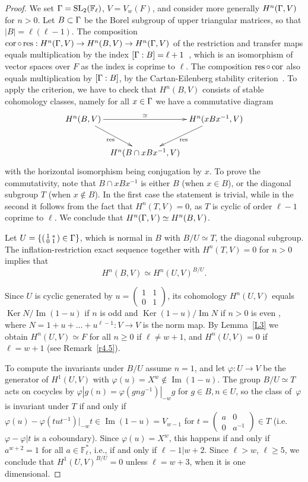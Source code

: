 \documentclass{amsart}
\theoremstyle{plain}
\theoremstyle{definition}
\numberwithin{equation}{section}
\def\im{\operatorname{Im}} \def\ker{\operatorname{Ker}} \def\stab{\operatorname{Stab }}
\def\SL{\mathrm{SL}} \def\PSL{\mathrm{PSL}}\def\GL{\mathrm{GL}}\def\PGL{\mathrm{PGL}}
\def\sm#1#2#3#4{\left(\begin{smallmatrix}#1&#2 \\ #3 & #4 \end{smallmatrix}\right)}
\def\vp{\varphi}
\def\rar{\rightarrow}\def\FF{\mathbb{F}}
\begin{document}
\begin{proof} We set $\G=\SL_2(\FF_\ell)$, $V=V_w(F)$, and 
consider more generally $H^n(\Gamma, V)$ for 
$n>0$. Let $B\subset \Gamma$ be the Borel subgroup of upper triangular matrices,
so that $|B|=\ell(\ell-1)$. The composition $
\cor\circ \res: H^n(\G, V)\rar H^n(B, V) \rar H^n(\G, V)$
of the restriction and transfer maps equals multiplication by the index
$[\Gamma:B]=\ell+1$~\cite[Ch. III, Prop. 9.5]{Br}, which is an isomorphism of  
vector spaces over $F$ as the index is coprime to $\ell$. The composition
$\operatorname{res}\circ \operatorname{cor}$ also equals multiplication by  $[\Gamma:B]$, 
by the Cartan-Eilenberg stability criterion~\cite[Ch. XII Prop. 9.4]{CE}. To
apply the criterion, we have to check that 
$H^n(B, V)$ consists of stable cohomology classes, namely 
for all $x\in \Gamma$ we have a commutative diagram
\[\xymatrix@C0.5em{
     H^n(B,V)\ar[rr]^-{\simeq} \ar[rd]_{\res} & & H^n(xBx^{-1},V)\ar[ld]^{\res} \\
     & H^n(B\cap xBx^{-1},V) &
     }
\]
with the horizontal isomorphism being conjugation by $x$. To prove the commutativity, note 
that $B\cap xBx^{-1}$ is either $B$ (when $x\in B$), or the diagonal subgroup $T$ (when $x\notin B$). 
In the first case the statement is trivial, while in the second it follows 
from the fact that $H^n(T, V)=0$, as $T$ is cyclic of order 
$\ell-1$ coprime to $\ell$. We conclude that $H^n(\Gamma, V)\simeq H^n(B, V)$.

Let $U=\{\sm 1*01 \in \G \}$, which is normal in $B$ with $B/U\simeq T$, 
the diagonal subgroup. The  inflation-restriction exact sequence together with $H^n(T, V)=0$ for 
$n>0$ implies that 
\[ H^n(B, V)\simeq H^n(U, V)^{B/U}.\]

Since $U$ is cyclic generated by $u=\sm 1101$, its cohomology 
$H^n(U, V)$ equals $\ker N/\im(1-u)$ if $n$ is odd and $\ker(1-u)/\im N$
if $n>0$ is even \cite[p. 58]{Br}, where $N=1+u+\ldots+u^{\ell-1}: V\rightarrow V$ 
is the norm map. By Lemma~\ref{L3} we obtain 
$H^n(U, V)\simeq F$ for all $n\ge 0$ if $\ell\ne w+1$, and $H^n(U, V)=0$ if $\ell=w+1$ 
(see Remark~\ref{r4.5}). 

To compute the invariants under $B/U$ assume $n=1$, and let $\vp:U\rar V$ be 
the generator of $H^1(U, V)$ with $\vp(u)=X^w\notin \im(1-u)$.  
The group $B/U\simeq T$ acts on cocycles by 
$\vp|g (n)=\vp(gn g^{-1})|_{-w}g$ for $g\in B, n\in U$, so the class of~$\vp$ 
is invariant under $T$ if and only if 
$\vp(u)-\vp(t u t^{-1})|_{-w} t \in \im(1-u)=V_{w-1}$ for 
$t=\sm a00{a^{-1}}\in T$ (i.e. $\vp-\vp|t$ is a coboundary). Since $\vp(u)=X^w$,
this happens if and only if $a^{w+2}=1$ for all $a\in \FF_\ell^*$, 
i.e., if and only if $\ell-1|w+2$. Since $\ell>w$, $\ell\ge 5$, we conclude 
that $H^1(U, V)^{B/U}=0$ unless $\ell=w+3$, when it is one dimensional.
\end{proof}
 
\end{document}
